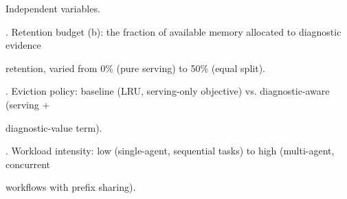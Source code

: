 \begin{flushleft}
\par\smallskip
\noindent Independent variables.\par
{}. Retention budget (b): the fraction of available memory allocated to diagnostic evidence\par
\noindent  retention, varied from 0\% (pure serving) to 50\% (equal split).\par
{}. Eviction policy: baseline (LRU, serving-only objective) vs. diagnostic-aware (serving +\par
\noindent  diagnostic-value term).\par
{}. Workload intensity: low (single-agent, sequential tasks) to high (multi-agent, concurrent\par
\noindent  workflows with prefix sharing).\par
\end{flushleft}
